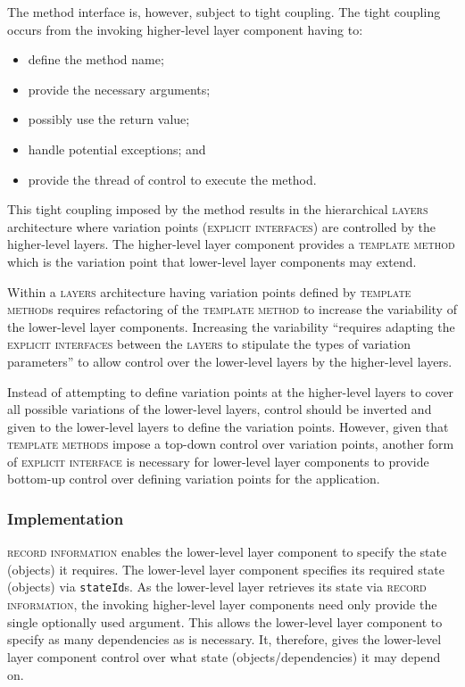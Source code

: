 \documentclass[prodmode]{style/acmlarge}
\begin{document}
The method interface is, however, subject to tight coupling.  The tight
coupling occurs from the invoking higher-level layer component having to:
\begin{itemize}
  \item define the method name;
  \item provide the necessary arguments;
  \item possibly use the return value;
  \item handle potential exceptions; and
  \item provide the thread of control to execute the method.
\end{itemize}

This tight coupling imposed by the method results in the hierarchical
\textsc{layers} architecture where variation points (\textsc{explicit
interfaces}) are controlled by the higher-level layers.  The higher-level layer
component provides a \textsc{template method} \cite{gof} which is the variation
point that lower-level layer components may extend.

Within a \textsc{layers} architecture having variation points defined by
\textsc{template method}s requires refactoring of the \textsc{template method}
to increase the variability of the lower-level layer components.  Increasing the
variability ``requires adapting the \textsc{explicit interfaces} between the
\textsc{layers} to stipulate the types of variation parameters'' \cite[p.
5]{ioc} to allow control over the lower-level layers by the higher-level layers.

Instead of attempting to define variation points at the higher-level layers to
cover all possible variations of the lower-level layers, control should be
inverted and given to the lower-level layers to define the variation points. 
However, given that \textsc{template methods} impose a top-down control over
variation points, another form of \textsc{explicit interface} is necessary for
lower-level layer components to provide bottom-up control over defining
variation points for the application.



\subsubsection*{Implementation}

\textsc{record information} enables the lower-level layer component to specify
the state (objects) it requires.  The lower-level layer component specifies its
required state (objects) via \texttt{stateId}s.  As the lower-level layer
retrieves its state via \textsc{record information}, the invoking higher-level
layer components need only provide the single optionally used argument.  This
allows the lower-level layer component to specify as many dependencies as is
necessary.  It, therefore, gives the lower-level layer component control over
what state (objects/dependencies) it may depend on.
\end{document}
